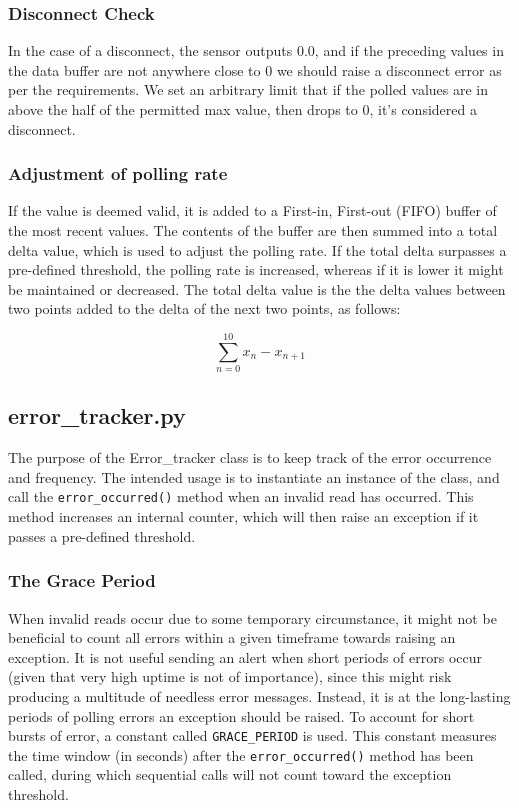 \subsubsection{Disconnect Check}
In the case of a disconnect, the sensor outputs 0.0, and if the preceding values in the data buffer are not anywhere close to 0 we should raise a disconnect error as per the requirements. We set an arbitrary limit that if the polled values are in above the half of the permitted max value, then drops to 0, it's considered a disconnect.

\subsubsection{Adjustment of polling rate}
If the value is deemed valid, it is added to a First-in, First-out (FIFO) buffer of the most recent values. The contents of the buffer are then summed into a total delta value, which is used to adjust the polling rate. If the total delta surpasses a pre-defined threshold, the polling rate is increased, whereas if it is lower it might be maintained or decreased. The total delta value is the the delta values between two points added to the delta of the next two points, as follows:

$$\sum_{n=0}^{10} x_n - x_{n+1}$$


\subsection{error\_tracker.py}
The purpose of the Error\_tracker class is to keep track of the error occurrence and frequency. The intended usage is to instantiate an instance of the class, and call the \lstinline{error_occurred()} method when an invalid read has occurred. This method increases an internal counter, which will then raise an exception if it passes a pre-defined threshold.

\subsubsection{The Grace Period}
When invalid reads occur due to some temporary circumstance, it might not be beneficial to count all errors within a given timeframe towards raising an exception. It is not useful sending an alert when short periods of errors occur (given that very high uptime is not of importance), since this might risk producing a multitude of needless error messages. Instead, it is at the long-lasting periods of polling errors an exception should be raised. To account for short bursts of error, a constant called \lstinline{GRACE_PERIOD} is used. This constant measures the time window (in seconds) after the \lstinline{error_occurred()} method has been called, during which sequential calls  will not count toward the exception threshold.

